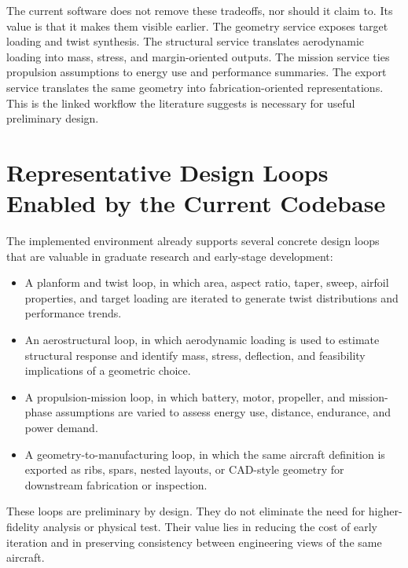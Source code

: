 \documentclass[12pt]{report}
\begin{document}
The current software does not remove these tradeoffs, nor should it claim to. Its value is that it makes them visible earlier. The geometry service exposes target loading and twist synthesis. The structural service translates aerodynamic loading into mass, stress, and margin-oriented outputs. The mission service ties propulsion assumptions to energy use and performance summaries. The export service translates the same geometry into fabrication-oriented representations. This is the linked workflow the literature suggests is necessary for useful preliminary design.

\section{Representative Design Loops Enabled by the Current Codebase}
The implemented environment already supports several concrete design loops that are valuable in graduate research and early-stage development:
\begin{itemize}
\item A planform and twist loop, in which area, aspect ratio, taper, sweep, airfoil properties, and target loading are iterated to generate twist distributions and performance trends.
\item An aerostructural loop, in which aerodynamic loading is used to estimate structural response and identify mass, stress, deflection, and feasibility implications of a geometric choice.
\item A propulsion-mission loop, in which battery, motor, propeller, and mission-phase assumptions are varied to assess energy use, distance, endurance, and power demand.
\item A geometry-to-manufacturing loop, in which the same aircraft definition is exported as ribs, spars, nested layouts, or CAD-style geometry for downstream fabrication or inspection.
\end{itemize}

These loops are preliminary by design. They do not eliminate the need for higher-fidelity analysis or physical test. Their value lies in reducing the cost of early iteration and in preserving consistency between engineering views of the same aircraft.
\end{document}
